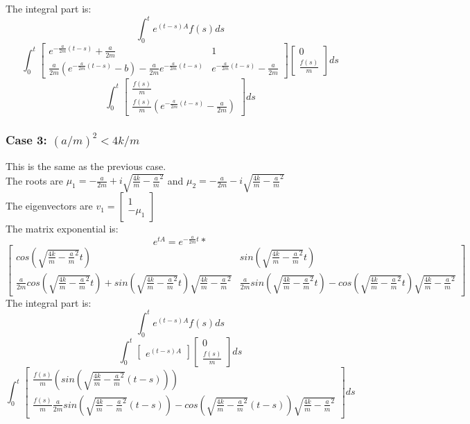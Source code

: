 \documentclass{article}
\begin{document}
The integral part is:
$$ \int_0^t e^{(t-s)A}f(s)ds$$
$$ \int_0^t \begin{bmatrix}
    e^{-\frac{a}{2m}(t-s)} + \frac{a}{2m} & 1\\
    \frac{a}{2m}(e^{-\frac{a}{2m}(t-s)} - b) - \frac{a}{2m}e^{-\frac{a}{2m}(t-s)}& e^{-\frac{a}{2m}(t-s)} - \frac{a}{2m}
\end{bmatrix} \begin{bmatrix}
    0\\
    \frac{f(s)}{m}
\end{bmatrix} ds$$
$$ \int_{0}^{t} \begin{bmatrix}
    \frac{f(s)}{m} \\
    \frac{f(s)}{m}(e^{-\frac{a}{2m}(t-s)} - \frac{a}{2m})
\end{bmatrix} ds$$
\subsubsection*{Case 3: $(a/m)^2 < 4k/m $}
This is the same as the previous case.\\
The roots are $\mu_1 = -\frac{a}{2m} + i\sqrt{\frac{4k}{m} - \frac{a}{m}^2}$ and $\mu_2 = -\frac{a}{2m} - i\sqrt{\frac{4k}{m} - \frac{a}{m}^2}$\\
The eigenvectors are $v_1 = \begin{bmatrix}
    1\\
    -\mu_1
\end{bmatrix}$\\
The matrix exponential is:
$$ e^{tA} = e^{-\frac{a}{2m}t}* $$ 
$$\begin{bmatrix}
    cos(\sqrt{\frac{4k}{m} - \frac{a}{m}^2}t) & sin(\sqrt{\frac{4k}{m} - \frac{a}{m}^2}t)\\
    \frac{a}{2m}cos(\sqrt{\frac{4k}{m} - \frac{a}{m}^2}t) + sin(\sqrt{\frac{4k}{m} - \frac{a}{m}^2}t)\sqrt{\frac{4k}{m} - \frac{a}{m}^2} & \frac{a}{2m}sin(\sqrt{\frac{4k}{m} - \frac{a}{m}^2}t) - cos(\sqrt{\frac{4k}{m} - \frac{a}{m}^2}t)\sqrt{\frac{4k}{m} - \frac{a}{m}^2}
\end{bmatrix}$$ 
The integral part is:
$$ \int_0^t e^{(t-s)A}f(s)ds$$
$$ \int_0^t \begin{bmatrix}
    e^{(t-s)A}
\end{bmatrix} \begin{bmatrix}
    0\\
    \frac{f(s)}{m}
\end{bmatrix} ds$$
$$ \int_{0}^{t} \begin{bmatrix}
    \frac{f(s)}{m}(sin(\sqrt{\frac{4k}{m} - \frac{a}{m}^2}(t-s)))   \\ 
    \frac{f(s)}{m} \frac{a}{2m}sin(\sqrt{\frac{4k}{m} - \frac{a}{m}^2}(t-s)) - cos(\sqrt{\frac{4k}{m} - \frac{a}{m}^2}(t-s))\sqrt{\frac{4k}{m} - \frac{a}{m}^2}
\end{bmatrix}ds$$
\end{document}

